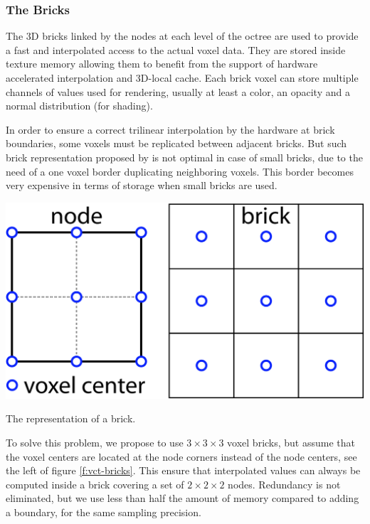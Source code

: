 \subsubsection{The Bricks}
The 3D bricks linked by the nodes at each level of the octree are used to provide a fast and interpolated access to the actual voxel data. They are stored inside texture memory allowing them to benefit from the support of hardware accelerated interpolation and 3D-local cache. Each brick voxel can store multiple channels of values used for rendering, usually at least a color, an opacity and a normal distribution (for shading). 

In order to ensure a correct trilinear interpolation by the hardware at brick boundaries, some voxels must be replicated between adjacent bricks. But such brick representation proposed by \cite[-20mm]{a:InteractiveIndirectIlluminationUsingVoxelConeTracing} is not optimal in case of small bricks, due to the need of a one voxel border duplicating neighboring voxels. This border becomes very expensive in terms of storage when small bricks are used.

\begin{marginfigure}
	\begin{center}
		\includegraphics{graphics/vct/vct-13-11}
	\end{center}
	\caption{The representation of a brick.}
\end{marginfigure}

To solve this problem, we propose to use $3\times 3\times 3$ voxel bricks, but assume that the voxel centers are located at the node corners instead of the node centers, see the left of figure \ref{f:vct-bricks}. This ensure that interpolated values can always be computed inside a brick covering a set of $2\times 2\times 2$ nodes. Redundancy is not eliminated, but we use less than half the amount of memory compared to adding a boundary, for the same sampling precision. 

